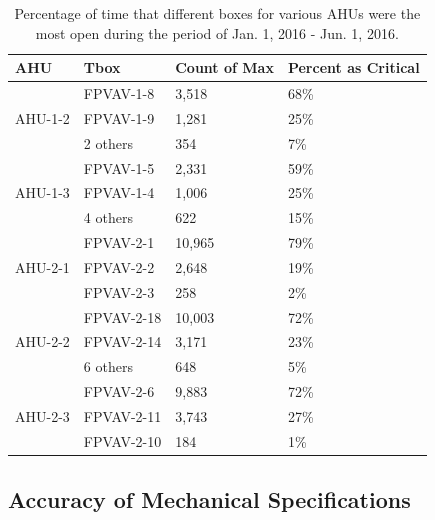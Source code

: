 \begin{table}
\centering
\caption{Percentage of time that different boxes for various AHUs were the most open during the period of Jan. 1, 2016 - Jun. 1, 2016.}
\label{tab:AHU12CriticalZone}
\begin{tabular}{@{}llll@{}}
\toprule
AHU                        & Tbox       & Count of Max & Percent as Critical \\ \midrule
\multirow{3}{*}{AHU-1-2}   & FPVAV-1-8  & 3,518        & 68\%                \\
                           & FPVAV-1-9  & 1,281        & 25\%                \\
                           & 2 others   & 354          & 7\%                 \\ \midrule
\multirow{3}{*}{AHU-1-3}   & FPVAV-1-5  & 2,331        & 59\%                \\
                           & FPVAV-1-4  & 1,006        & 25\%                \\
                           & 4 others   & 622          & 15\%                 \\ \midrule
\multirow{3}{*}{AHU-2-1}   & FPVAV-2-1  & 10,965       & 79\%  \\
                           & FPVAV-2-2  & 2,648        & 19\%  \\
                           & FPVAV-2-3  & 258          & 2\% \\ \midrule
\multirow{3}{*}{AHU-2-2}   & FPVAV-2-18 & 10,003       & 72\%  \\
                           & FPVAV-2-14 & 3,171        & 23\%  \\
                           & 6 others   & 648          & 5\%  \\ \midrule
\multirow{3}{*}{AHU-2-3}   & FPVAV-2-6  & 9,883        & 72\%  \\
                           & FPVAV-2-11 & 3,743        & 27\%  \\
                           & FPVAV-2-10 & 184          & 1\%  \\ \midrule
\end{tabular}
\end{table}


\subsection{Accuracy of Mechanical Specifications}

